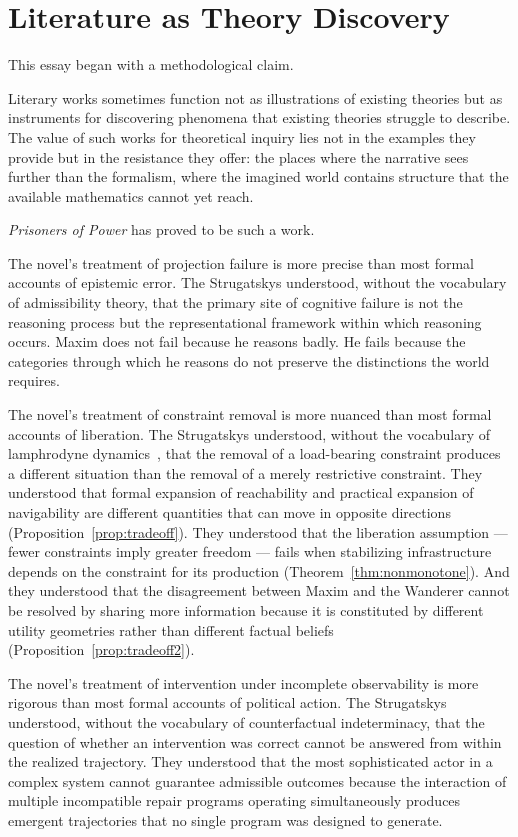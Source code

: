 \documentclass[12pt, a4paper]{article}
\theoremstyle{plain}
\theoremstyle{definition}
\theoremstyle{remark}
\begin{document}
\section{Literature as Theory Discovery}

This essay began with a methodological claim.

Literary works sometimes function not as
illustrations of existing theories but as
instruments for discovering phenomena that
existing theories struggle to describe. The value
of such works for theoretical inquiry lies not
in the examples they provide but in the resistance
they offer: the places where the narrative sees
further than the formalism, where the imagined
world contains structure that the available
mathematics cannot yet reach.

\textit{Prisoners of Power} has proved to be
such a work.

The novel's treatment of projection failure is
more precise than most formal accounts of epistemic
error. The Strugatskys understood, without the
vocabulary of admissibility theory, that the
primary site of cognitive failure is not the
reasoning process but the representational
framework within which reasoning occurs. Maxim
does not fail because he reasons badly. He fails
because the categories through which he reasons
do not preserve the distinctions the world
requires.

The novel's treatment of constraint removal is
more nuanced than most formal accounts of
liberation. The Strugatskys understood, without
the vocabulary of lamphrodyne dynamics~\cite{flyxion2026rsvp},
that the removal of a load-bearing constraint
produces a different situation than the removal
of a merely restrictive constraint. They
understood that formal expansion of reachability
and practical expansion of navigability are
different quantities that can move in opposite
directions (Proposition~\ref{prop:tradeoff}).
They understood that the liberation assumption
--- fewer constraints imply greater freedom ---
fails when stabilizing infrastructure depends
on the constraint for its production
(Theorem~\ref{thm:nonmonotone}). And they
understood that the disagreement between Maxim
and the Wanderer cannot be resolved by sharing
more information because it is constituted by
different utility geometries rather than
different factual beliefs
(Proposition~\ref{prop:tradeoff2}).

The novel's treatment of intervention under
incomplete observability is more rigorous than
most formal accounts of political action. The
Strugatskys understood, without the vocabulary
of counterfactual indeterminacy, that the question
of whether an intervention was correct cannot be
answered from within the realized trajectory.
They understood that the most sophisticated actor
in a complex system cannot guarantee admissible
outcomes because the interaction of multiple
incompatible repair programs operating
simultaneously produces emergent trajectories
that no single program was designed to generate.
\end{document}
